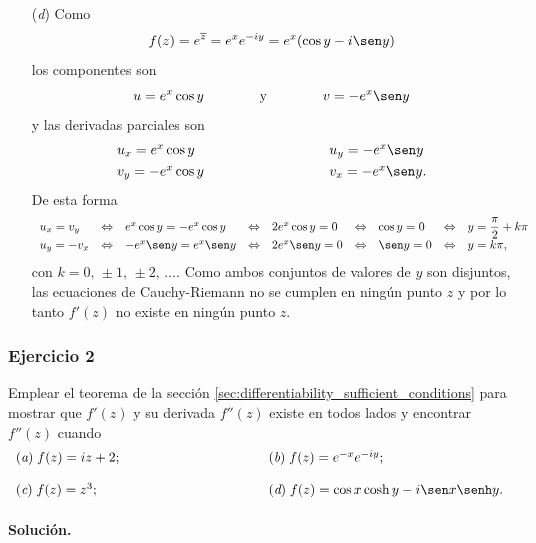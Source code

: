 \documentclass[a4paper]{report}
\begin{document}
\begin{enumerate}
 \item[(\textit{d})] Como
 \[
  f(z)=e^{\overline{z}}=e^xe^{-iy}=e^x(\cos y-i\sen y)
 \]
 los componentes son 
 \[
  u=e^x\cos y
  \qquad\qquad\textrm{y}\qquad\qquad
  v=-e^x\sen y
 \]
 y las derivadas parciales son
 \[
 \begin{array}{ll}
  u_x=e^x\cos y\qquad\qquad\qquad\qquad&u_y=-e^x\sen y\\[\smallskipamount]
  v_y=-e^x\cos y\qquad\qquad\qquad\qquad&v_x=-e^x\sen y.
 \end{array}
 \]
 De esta forma
 \[
 \begin{array}{lllllllll}
  u_x=v_y&\Leftrightarrow&e^x\cos y=-e^x\cos y&\Leftrightarrow&2e^x\cos y=0&\Leftrightarrow&\cos y=0&\Leftrightarrow&y=\dfrac{\pi}{2}+k\pi\\[\smallskipamount]
  u_y=-v_x&\Leftrightarrow&-e^x\sen y=e^x\sen y&\Leftrightarrow&2e^x\sen y=0&\Leftrightarrow&\sen y=0&\Leftrightarrow&y=k\pi,
 \end{array}
 \] 
 con \(k=0,\,\pm1,\,\pm2,\,\dots\).
 Como ambos conjuntos de valores de \(y\) son disjuntos, las ecuaciones de Cauchy-Riemann no se cumplen en ningún punto \(z\) y por lo tanto \(f'(z)\) no existe en ningún punto \(z\).
\end{enumerate}

\subsubsection{Ejercicio 2}

Emplear el teorema de la sección \ref{sec:differentiability_sufficient_conditions} para mostrar que \(f'(z)\) y su derivada \(f''(z)\) existe en todos lados y encontrar \(f''(z)\) cuando
\[
 \begin{array}{ll}
  (\textit{a})\;f(z)=iz+2;\qquad\qquad\qquad\qquad\qquad&(\textit{b})\;f(z)=e^{-x}e^{-iy};\\[\bigskipamount]
  (\textit{c})\;f(z)=z^3;\qquad\qquad\qquad\qquad\qquad&(\textit{d})\;f(z)=\cos x\cosh y-i\sen x\senh y.
 \end{array}
\]

\paragraph{Solución.} 
\end{document}
